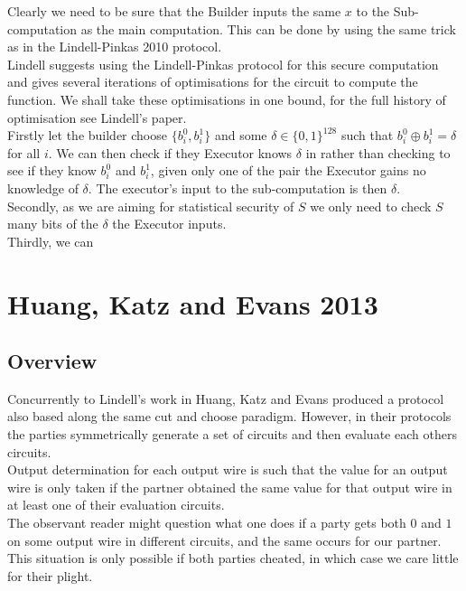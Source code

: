 \documentclass[ %
                    author={Nicholas Tutte},
                supervisor={Prof. Nigel Smart},
                    degree={MEng},
                     title={Secure Two Party Computation},
                  subtitle={A practical comparison of recent protocols},
                      type={Research - GG1K},
                      year={2015} ]{dissertation}
\begin{document}
					Clearly we need to be sure that the Builder inputs the same $x$ to the Sub-computation as the main computation. This can be done by using the same trick as in the Lindell-Pinkas 2010 protocol.\\

					Lindell suggests using the Lindell-Pinkas protocol for this secure computation and gives several iterations of optimisations for the circuit to compute the function. We shall take these optimisations in one bound, for the full history of optimisation see Lindell's paper.\\

					Firstly let the builder choose $\{b_i^0, b_i^1\}$ and some $\delta \in \{0, 1\}^{128}$ such that $b_i^0 \oplus b_i^1 = \delta$ for all $i$. We can then check if they Executor knows $\delta$ in rather than checking to see if they know $b_i^0$ and $b_i^1$, given only one of the pair the Executor gains no knowledge of $\delta$. The executor's input to the sub-computation is then $\delta$.\\

					Secondly, as we are aiming for statistical security of $S$ we only need to check $S$ many bits of the $\delta$ the Executor inputs.\\

					Thirdly, we can \\

		\section{Huang, Katz and Evans 2013}
			\subsection*{Overview}

				Concurrently to Lindell's work in \cite{Lindell_CnC_2013} Huang, Katz and Evans produced a protocol also based along the same cut and choose paradigm. However, in their protocols the parties symmetrically generate a set of circuits and then evaluate each others circuits.\\

				Output determination for each output wire is such that the value for an output wire is only taken if the partner obtained the same value for that output wire in at least one of their evaluation circuits.\\

				The observant reader might question what one does if a party gets both $0$ and $1$ on some output wire in different circuits, and the same occurs for our partner. This situation is only possible if both parties cheated, in which case we care little for their plight.\\
\end{document}
